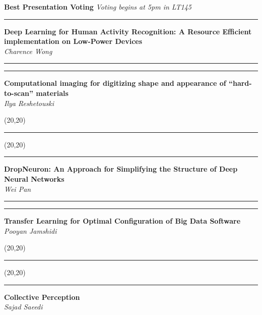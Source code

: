 \documentclass[11pt]{article}
\newcommand{\talk}[1]{\Large\flushleft\textbf{#1}\\}
\newcommand{\speaker}[1]{\textit{#1}\\}
\newcommand{\separator}{\noindent\rule{\linewidth}{0.1mm}}
\newcommand{\votebox}{\vspace{-5cm}\noindent\hfill\framebox(20,20){}}
\newcommand{\hstrut}{\noindent\color{iclightblue}\rule{\linewidth}{0pt}}
\begin{document}
\clearpage
\noindent
\textbf{\flushleft\LARGE\color{icdarkblue}Best Presentation Voting}\hfill%
\textit{Voting begins at 5pm in LT145}\\
\noindent
\begin{minipage}[t]{0.49\linewidth}
\separator%
\talk{Deep Learning for Human Activity Recognition: A Resource Efficient
      implementation on Low-Power Devices}
\speaker{Charence Wong}
\end{minipage}
\begin{minipage}[t]{0.02\linewidth}
\hstrut%
\end{minipage}
\begin{minipage}[t]{0.49\linewidth}
\separator%
\talk{Computational imaging for digitizing shape and appearance of
      ``hard-to-scan'' materials}
\speaker{Ilya Reshetouski}
\end{minipage}
\vfill
\noindent
\begin{minipage}[b]{0.49\linewidth}
\votebox%
\end{minipage}
\begin{minipage}[b]{0.02\linewidth}
\hstrut%
\end{minipage}
\begin{minipage}[b]{0.49\linewidth}
\votebox%
\end{minipage}
\noindent
\begin{minipage}[t]{0.49\linewidth}
\separator%
\talk{DropNeuron: An Approach for Simplifying the Structure of Deep Neural
      Networks}
\speaker{Wei Pan}
\end{minipage}
\begin{minipage}[t]{0.02\linewidth}
\hstrut%
\end{minipage}
\begin{minipage}[t]{0.49\linewidth}
\separator%
\talk{Transfer Learning for Optimal Configuration of Big Data Software}
\speaker{Pooyan Jamshidi}
\end{minipage}
\vfill
\noindent
\begin{minipage}[b]{0.49\linewidth}
\votebox%
\end{minipage}
\begin{minipage}[b]{0.02\linewidth}
\hstrut%
\end{minipage}
\begin{minipage}[b]{0.49\linewidth}
\votebox%
\end{minipage}
\noindent
\begin{minipage}[t]{0.49\linewidth}
\separator%
\talk{Collective Perception}
\speaker{Sajad Saeedi}
\end{minipage}
\end{document}
